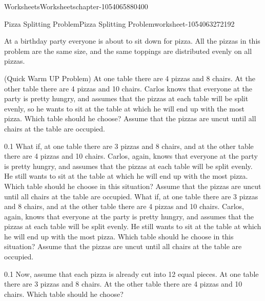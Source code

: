 \documentclass[twoside,11pt,]{book}
\begin{document}
\begin{chapterptx}{Worksheets}{}{Worksheets}{}{}{chapter-1054065880400}
%
%
\typeout{************************************************}
\typeout{************************************************}
%
\begin{worksheet-section-numberless}{Pizza Splitting Problem}{}{Pizza Splitting Problem}{}{}{worksheet-1054063272192}
\begin{introduction}{}%
\hypertarget{p-1054066738816}{}%
At a birthday party everyone is about to sit down for pizza.  All the pizzas in this problem are the same size, and the same toppings are distributed evenly on all pizzas.%
\end{introduction}%
\hypertarget{p-1054066715888}{}%
(Quick Warm UP Problem) At one table there are 4 pizzas and 8 chairs.  At the other table there are 4 pizzas and 10 chairs.  Carlos knows that everyone at the party is pretty hungry, and assumes that the pizzas at each table will be split evenly, so he wants to sit at the table at which he will end up with the most pizza.  Which table should he choose?  Assume that the pizzas are uncut until all chairs at the table are occupied.%
\begin{divisionexercise}{1}{}{0.1}{
        What if, at one table there are 3 pizzas and 8 chairs, and at the other table there are 4 pizzas and 10 chairs.  Carlos, again, knows that everyone at the party is pretty hungry, and assumes that the pizzas at each table will be split evenly.  He still wants to sit at the table at which he will end up with the most pizza.  Which table should he choose in this situation? Assume that the pizzas are uncut until all chairs at the table are occupied.
      }%
\hypertarget{p-1054063213504}{}%
What if, at one table there are 3 pizzas and 8 chairs, and at the other table there are 4 pizzas and 10 chairs.  Carlos, again, knows that everyone at the party is pretty hungry, and assumes that the pizzas at each table will be split evenly.  He still wants to sit at the table at which he will end up with the most pizza.  Which table should he choose in this situation? Assume that the pizzas are uncut until all chairs at the table are occupied.%
\end{divisionexercise}%
\begin{divisionexercise}{2}{}{0.1}{
        Now, assume that each pizza is already cut into 12 equal pieces. At one table there are 3 pizzas and 8 chairs.  At the other table there are 4 pizzas and 10 chairs.  Which table should he choose?
}
\end{divisionexercise}
\end{worksheet-section-numberless}
\end{chapterptx}
\end{document}
